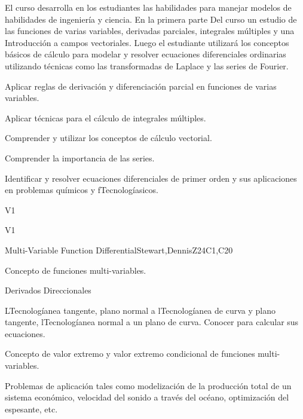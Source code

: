 \begin{syllabus}


\begin{justification}

El curso desarrolla en los estudiantes las habilidades para manejar modelos de habilidades de ingeniería y ciencia. En la primera parte
Del curso un estudio de las funciones de varias variables, derivadas parciales, integrales múltiples y una
Introducción a campos vectoriales. Luego el estudiante utilizará los conceptos básicos de cálculo para modelar y resolver ecuaciones diferenciales ordinarias utilizando técnicas como las transformadas de Laplace y las series de Fourier.

\end{justification}

\begin{goals}
  \item Aplicar reglas de derivación y diferenciación parcial en funciones de varias variables.
  \item Aplicar técnicas para el cálculo de integrales múltiples.
  \item Comprender y utilizar los conceptos de cálculo vectorial.
  \item Comprender la importancia de las series.
  \item Identificar y resolver ecuaciones diferenciales de primer orden y sus aplicaciones en problemas químicos y fTecnologíasicos.
\end{goals}

\begin{outcomes}{V1}
    \item {}  
    \item {}
\end{outcomes}

\begin{competences}{V1}
    \item {}
    \item {}
\end{competences}

\begin{unit}{Multi-Variable Function Differential}{}{Stewart,DennisZ}{24}{C1,C20}
   \begin{topics}      
    \item Concepto de funciones multi-variables.
    \item Derivados Direccionales
    \item LTecnologíanea tangente, plano normal a lTecnologíanea de curva y plano tangente, lTecnologíanea normal a un plano de curva. Conocer para calcular sus ecuaciones.
    \item Concepto de valor extremo y valor extremo condicional de funciones multi-variables.
    \item Problemas de aplicación tales como modelización de la producción total de un sistema económico, velocidad del sonido a través del océano, optimización del espesante, etc.
      \end{topics}


\end{unit}
\end{syllabus}
